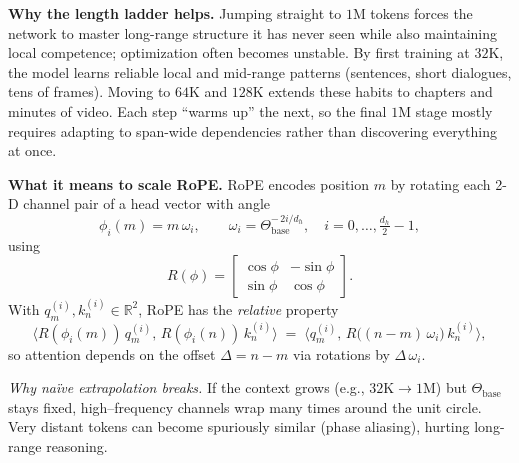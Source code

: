 \begin{enrichment}
\begin{enrichment}
        \noindent\textbf{Why the length ladder helps.} Jumping straight to \(1\)M tokens forces the network to master long-range structure it has never seen while also maintaining local competence; optimization often becomes unstable. By first training at \(32\mathrm{K}\), the model learns reliable local and mid-range patterns (sentences, short dialogues, tens of frames). Moving to \(64\mathrm{K}\) and \(128\mathrm{K}\) extends these habits to chapters and minutes of video. Each step “warms up” the next, so the final \(1\mathrm{M}\) stage mostly requires adapting to span-wide dependencies rather than discovering everything at once.
        
        \medskip
        \noindent\textbf{What it means to scale RoPE.}
        RoPE encodes position \(m\) by rotating each 2-D channel pair of a head vector with angle
        \[
        \phi_i(m)=m\,\omega_i,\qquad 
        \omega_i=\Theta_{\text{base}}^{-\,2i/d_h},\quad i=0,\ldots,\tfrac{d_h}{2}-1,
        \]
        using
        \[
        R(\phi)=
        \begin{bmatrix}
            \cos\phi & -\sin\phi\\
            \sin\phi & \cos\phi
        \end{bmatrix}.
        \]
        With \(q_m^{(i)},k_n^{(i)}\in\mathbb{R}^2\), RoPE has the \emph{relative} property
        \[
        \big\langle R(\phi_i(m))\,q_m^{(i)},\,R(\phi_i(n))\,k_n^{(i)}\big\rangle
        \;=\;
        \big\langle q_m^{(i)},\,R\big((n-m)\,\omega_i\big)\,k_n^{(i)}\big\rangle,
        \]
        so attention depends on the offset \(\Delta=n-m\) via rotations by \(\Delta\,\omega_i\).
        
        \medskip
        \noindent\textit{Why naïve extrapolation breaks.}
        If the context grows (e.g., $32\mathrm{K}\!\to\!1\mathrm{M}$) but $\Theta_{\text{base}}$ stays fixed, high–frequency channels wrap many times around the unit circle. Very distant tokens can become spuriously similar (phase aliasing), hurting long-range reasoning.
        

\end{enrichment}
\end{enrichment}
